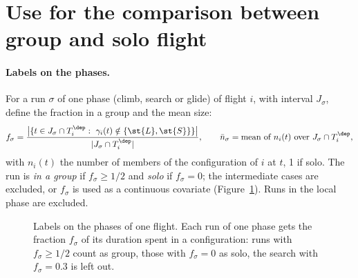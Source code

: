 \section{Use for the comparison between group and solo flight}\label{sec:comparison}

\paragraph{Labels on the phases.} For a run $\sigma$ of one phase (climb, search or glide)
of flight $i$, with interval $J_\sigma$, define the fraction in a group and the mean size:
\begin{equation}\label{eq:segment}
  f_\sigma=\frac{\bigl|\{t\in J_\sigma\cap T^\dep_i:\ \gamma_i(t)\notin\{\st{L},\st{S}\}\}\bigr|}{|J_\sigma\cap T^\dep_i|},
  \qquad
  \bar n_\sigma=\text{mean of } n_i(t) \text{ over } J_\sigma\cap T^\dep_i ,
\end{equation}
with $n_i(t)$ the number of members of the configuration of $i$ at $t$, 1 if solo. The run is
\emph{in a group} if $f_\sigma\ge1/2$ and \emph{solo} if $f_\sigma=0$; the intermediate cases are
excluded, or $f_\sigma$ is used as a continuous covariate (Figure~\ref{fig:segments}). Runs in the
local phase are excluded.

\begin{figure}
\centering
{}
\caption{Labels on the phases of one flight. Each run of one phase gets the fraction
$f_\sigma$ of its duration spent in a configuration: runs with $f_\sigma\ge1/2$ count as group,
those with $f_\sigma=0$ as solo, the search with $f_\sigma=0.3$ is left out.}
\label{fig:segments}
\end{figure}

